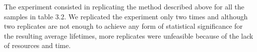 \documentclass[a4paper,english,12pt,bibliography=totoc]{scrreprt}
\begin{document}

The experiment consisted in replicating the method described above for all the samples in table 3.2. We replicated the experiment only two times and although two replicates are not enough to achieve any form of statistical significance for the resulting average lifetimes, more replicates were unfeasible because of the lack of resources and time.\\
\end{document}
